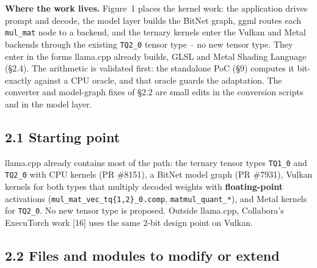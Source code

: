 \documentclass[
  10pt,
]{article}
\begin{document}
\textbf{Where the work lives.} Figure~1 places the kernel work: the
application drives prompt and decode, the model layer builds the BitNet
graph, ggml routes each \texttt{mul\_mat} node to a backend, and the
ternary kernels enter the Vulkan and Metal backends through the existing
\texttt{TQ2\_0} tensor type -- no new tensor type. They enter in the
forms llama.cpp already builds, GLSL and Metal Shading Language
(\S{}2.4). The arithmetic is validated first: the standalone PoC
(\S{}9) computes it bit-exactly against a CPU oracle, and that oracle
guards the adaptation. The converter and model-graph fixes of \S{}2.2
are small edits in the conversion scripts and in the model layer.

\subsection{2.1 Starting point}\label{starting-point}

llama.cpp already contains most of the path: the ternary tensor types
\texttt{TQ1\_0} and \texttt{TQ2\_0} with CPU kernels (PR \#8151), a
BitNet model graph (PR \#7931), Vulkan kernels for both types that
multiply decoded weights with \textbf{floating-point} activations
(\texttt{mul\_mat\_vec\_tq\{1,2\}\_0.comp}, \texttt{matmul\_quant\_*}),
and Metal kernels for \texttt{TQ2\_0}. No new tensor type is proposed.
Outside llama.cpp, Collabora's ExecuTorch work [16] uses the same
2-bit design point on Vulkan.

\subsection{2.2 Files and modules to modify or
extend}\label{files-and-modules-to-modify-or-extend}
\end{document}

